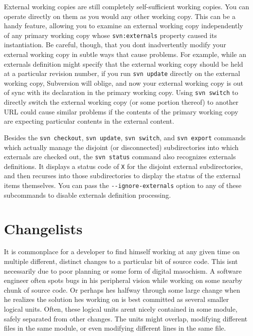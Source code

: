 External working copies are still completely self-sufficient working
copies. You can operate directly on them as you would any other working
copy. This can be a handy feature, allowing you to examine an external
working copy independently of any primary working copy whose
\texttt{svn:externals} property caused its instantiation. Be careful,
though, that you don\textquotesingle t inadvertently modify your
external working copy in subtle ways that cause problems. For example,
while an externals definition might specify that the external working
copy should be held at a particular revision number, if you run
\texttt{svn\ update} directly on the external working copy, Subversion
will oblige, and now your external working copy is out of sync with its
declaration in the primary working copy. Using \texttt{svn\ switch} to
directly switch the external working copy (or some portion thereof) to
another URL could cause similar problems if the contents of the primary
working copy are expecting particular contents in the external content.

Besides the \texttt{svn\ checkout}, \texttt{svn\ update},
\texttt{svn\ switch}, and \texttt{svn\ export} commands which actually
manage the disjoint (or disconnected) subdirectories into which
externals are checked out, the \texttt{svn\ status} command also
recognizes externals definitions. It displays a status code of
\texttt{X} for the disjoint external subdirectories, and then recurses
into those subdirectories to display the status of the external items
themselves. You can pass the \texttt{-\/-ignore-externals} option to any
of these subcommands to disable externals definition processing.

\section{Changelists}\label{svn.advanced.changelists}

It is commonplace for a developer to find himself working at any given
time on multiple different, distinct changes to a particular bit of
source code. This isn\textquotesingle t necessarily due to poor planning
or some form of digital masochism. A software engineer often spots bugs
in his peripheral vision while working on some nearby chunk of source
code. Or perhaps he\textquotesingle s halfway through some large change
when he realizes the solution he\textquotesingle s working on is best
committed as several smaller logical units. Often, these logical units
aren\textquotesingle t nicely contained in some module, safely separated
from other changes. The units might overlap, modifying different files
in the same module, or even modifying different lines in the same file.

